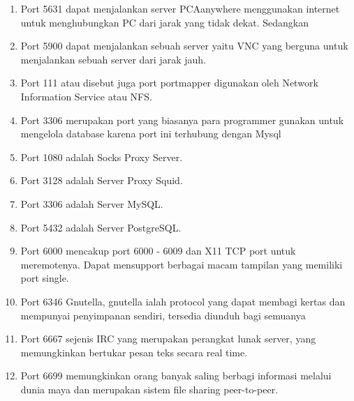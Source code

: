 \begin{enumerate}
\item Port 5631 dapat menjalankan server PCAanywhere menggunakan internet untuk menghubungkan PC dari jarak yang tidak dekat.
Sedangkan 
\item Port 5900 dapat menjalankan sebuah server yaitu VNC yang berguna untuk menjalankan sebuah server dari jarak jauh.
\item Port 111 atau disebut juga port portmapper digunakan oleh Network Information Service atau NFS.
\item Port 3306 merupakan port yang biasanya para programmer gunakan untuk mengelola database karena port ini terhubung dengan Mysql
\item Port 1080 adalah Socks Proxy Server.
\item Port 3128 adalah Server Proxy Squid.
\item Port 3306 adalah Server MySQL.
\item Port 5432 adalah Server PostgreSQL.
\item Port 6000 mencakup port 6000 - 6009 dan X11 TCP port untuk meremotenya. Dapat mensupport berbagai macam tampilan yang memiliki port single.
\item Port 6346 Gnutella, gnutella ialah protocol yang dapat membagi kertas dan mempunyai penyimpanan sendiri, tersedia diunduh bagi semuanya
\item Port 6667 sejenis IRC yang merupakan perangkat lunak server, yang memungkinkan bertukar pesan teks secara real time.
\item Port 6699 memungkinkan orang banyak saling berbagi informasi melalui dunia maya dan  merupakan sistem file sharing peer-to-peer.


\end{enumerate}
